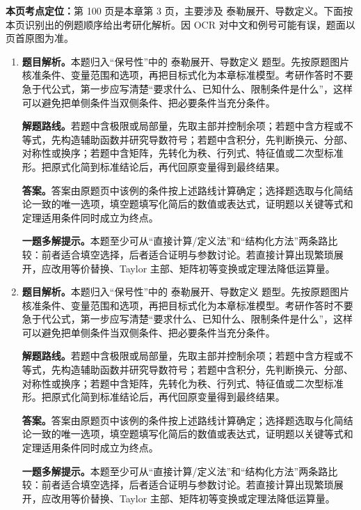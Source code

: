 \begin{solutionblock}
\textbf{本页考点定位：}第 100 页是本章第 3 页，主要涉及 泰勒展开、导数定义。下面按本页识别出的例题顺序给出考研化解析。因 OCR 对中文和例号可能有误，题面以页首原图为准。

\begin{enumerate}[label=\textbf{例\arabic*.}, leftmargin=2.4em]

\item \textbf{题目解析。}本题归入“保号性”中的 泰勒展开、导数定义 题型。先按原题图片核准条件、变量范围和选项，再把目标式化为本章标准模型。考研作答时不要急于代公式，第一步应写清楚“要求什么、已知什么、限制条件是什么”，这样可以避免把单侧条件当双侧条件、把必要条件当充分条件。

\textbf{解题路线。}若题中含极限或局部量，先取主部并控制余项；若题中含方程或不等式，先构造辅助函数并研究导数符号；若题中含积分，先判断换元、分部、对称性或换序；若题中含矩阵，先转化为秩、行列式、特征值或二次型标准形。把原式化简到标准结论后，再代回原变量得到最终结果。

\textbf{答案。}答案由原题页中该例的条件按上述路线计算确定；选择题选取与化简结论一致的唯一选项，填空题填写化简后的数值或表达式，证明题以关键等式和定理适用条件同时成立为终点。

\textbf{一题多解提示。}本题至少可从“直接计算/定义法”和“结构化方法”两条路比较：前者适合填空选择，后者适合证明与参数讨论。若直接计算出现繁琐展开，应改用等价替换、Taylor 主部、矩阵初等变换或定理法降低运算量。

\item \textbf{题目解析。}本题归入“保号性”中的 泰勒展开、导数定义 题型。先按原题图片核准条件、变量范围和选项，再把目标式化为本章标准模型。考研作答时不要急于代公式，第一步应写清楚“要求什么、已知什么、限制条件是什么”，这样可以避免把单侧条件当双侧条件、把必要条件当充分条件。

\textbf{解题路线。}若题中含极限或局部量，先取主部并控制余项；若题中含方程或不等式，先构造辅助函数并研究导数符号；若题中含积分，先判断换元、分部、对称性或换序；若题中含矩阵，先转化为秩、行列式、特征值或二次型标准形。把原式化简到标准结论后，再代回原变量得到最终结果。

\textbf{答案。}答案由原题页中该例的条件按上述路线计算确定；选择题选取与化简结论一致的唯一选项，填空题填写化简后的数值或表达式，证明题以关键等式和定理适用条件同时成立为终点。

\textbf{一题多解提示。}本题至少可从“直接计算/定义法”和“结构化方法”两条路比较：前者适合填空选择，后者适合证明与参数讨论。若直接计算出现繁琐展开，应改用等价替换、Taylor 主部、矩阵初等变换或定理法降低运算量。


\end{enumerate}
\end{solutionblock}
